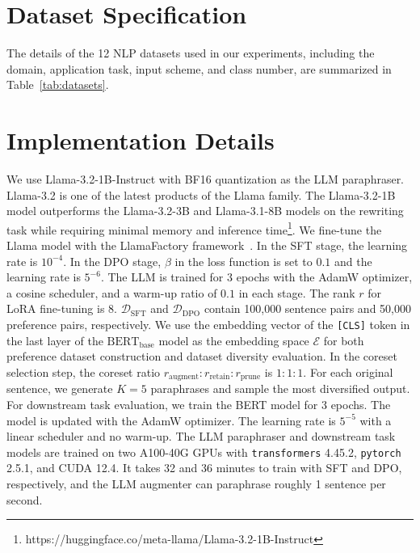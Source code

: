 \clearpage
\appendix






\section{Dataset Specification}
\label{app:dataset}
The details of the 12 NLP datasets used in our experiments, including the domain, application task, input scheme, and class number, are summarized in Table~\ref{tab:datasets}. 


\section{Implementation Details} 
We use Llama-3.2-1B-Instruct with BF16 quantization as the LLM paraphraser. 
Llama-3.2 is one of the latest products of the Llama family. The Llama-3.2-1B model outperforms the Llama-3.2-3B and Llama-3.1-8B models on the rewriting task while requiring minimal memory and inference time\footnote{https://huggingface.co/meta-llama/Llama-3.2-1B-Instruct}. 
We fine-tune the Llama model with the LlamaFactory framework~\cite{zheng2024llamafactory}. 
In the SFT stage, the learning rate is \(10^{-4}\). In the DPO stage, \(\beta\) in the loss function is set to \(0.1\) and the learning rate is \(5^{-6}\). 
The LLM is trained for 3 epochs with the AdamW optimizer, a cosine scheduler, and a warm-up ratio of \(0.1\) in each stage. 
The rank \(r\) for LoRA fine-tuning is \(8\). 
\(\mathcal{D}_{\text{SFT}}\) and \(\mathcal{D}_{\text{DPO}}\) contain 100,000 sentence pairs and 50,000 preference pairs, respectively. 
We use the embedding vector of the \texttt{[CLS]} token in the last layer of the \(\text{BERT}_{\text{base}}\) model as the embedding space \(\mathcal{E}\) for both preference dataset construction and dataset diversity evaluation. 
In the coreset selection step, the coreset ratio \(r_\text{augment} : r_\text{retain} : r_\text{prune}\) is \(1:1:1\). 
For each original sentence, we generate \(K=5\) paraphrases and sample the most diversified output. 
For downstream task evaluation, we train the BERT model for 3 epochs. 
The model is updated with the AdamW optimizer. The learning rate is \(5^{-5}\) with a linear scheduler and no warm-up. 
The LLM paraphraser and downstream task models are trained on two A100-40G GPUs with \texttt{transformers} 4.45.2, \texttt{pytorch} 2.5.1, and CUDA 12.4. 
It takes 32 and 36 minutes to train with SFT and DPO, respectively, and the LLM augmenter can paraphrase roughly 1 sentence per second. 



